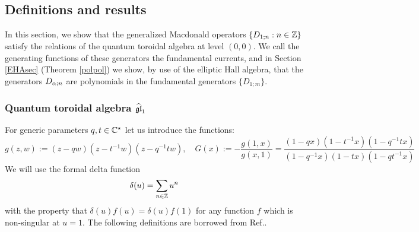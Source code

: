 
\subsection{Definitions and results}

In this section, we show that the generalized Macdonald operators $\{{D}_{1;n}: n\in {\mathbb Z}\}$ satisfy the relations of the quantum toroidal algebra \cite{Miki07,FJMM} at level $(0,0)$. We call the generating functions of these generators the fundamental currents, and in Section \ref{EHAsec} (Theorem \ref{polpol}) we show, by use of the elliptic Hall algebra, that the generators $D_{{\alpha};n}$ are polynomials in the fundamental generators $\{D_{1;m}\}$.

\subsubsection{Quantum toroidal algebra $\widehat{{\mathfrak{gl}}}_1$}

For generic parameters $q,t \in {\mathbb C}^\star$ let us introduce the functions:
\begin{equation}\label{defofg}
g(z,w):= (z-q w)(z-t^{-1}w)(z-q^{-1}t w),\quad 
G(x):=-\frac{g(1,x)}{g(x,1)}=\frac{(1-q x)(1-t^{-1}x)(1-q^{-1}t x)}{(1-q^{-1} x)(1-t x)(1-qt^{-1} x)}
\end{equation}
We will use the formal delta function
\begin{equation}\label{formaldet} \delta(u)=\sum_{n\in {\mathbb Z}} u^n \end{equation}
with the property that $\delta(u) f(u)=\delta(u) f(1)$ for any function $f$ which is non-singular at $u=1$.
The following definitions are borrowed from Ref.\cite{AFS}.

